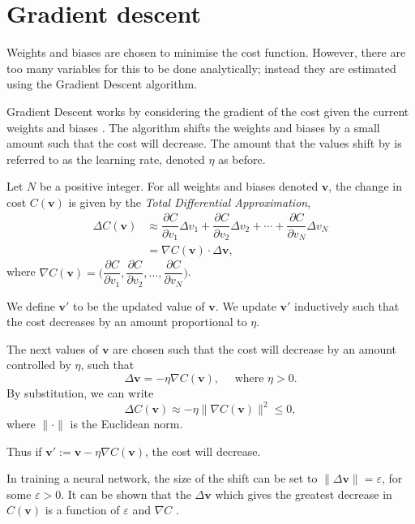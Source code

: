 \section{Gradient descent}\label{nnets-graddesc}

Weights and biases are chosen to minimise the cost function. However, there are too many variables for this to be done analytically; instead they are estimated using the Gradient Descent algorithm.

Gradient Descent works by considering the gradient of the cost given the current weights and biases \cite{Nielson2015}. The algorithm shifts the weights and biases by a small amount such that the cost will decrease. The amount that the values shift by is referred to as the learning rate, denoted $\eta$ as before.

Let $N$ be a positive integer. For all weights and biases denoted $\mathbf{v}$, the change in cost $C(\mathbf{v})$ is given by the \textit{Total Differential Approximation},
\begin{align*}
	\Delta C(\mathbf{v}) & \approx \dfrac{\partial C}{\partial v_1}\Delta v_1 + \dfrac{\partial C}{\partial v_2}\Delta v_2 + \cdots + \dfrac{\partial C}{\partial v_N}\Delta v_N\\
	& = \nabla C(\mathbf{v})\cdot \Delta \mathbf{v},
\end{align*}
where $\nabla C(\mathbf{v}) = \Big(\dfrac{\partial C}{\partial v_1}, \dfrac{\partial C}{\partial v_2},\ldots, \dfrac{\partial C}{\partial v_N}\Big)$.

We define $\mathbf{v}'$ to be the updated value of $\mathbf{v}$. We update $\mathbf{v}'$ inductively such that the cost decreases by an amount proportional to $\eta$.

The next values of $\mathbf{v}$ are chosen such that the cost will decrease by an amount controlled by $\eta$, such that
\[
	\Delta\mathbf{v} = -\eta \nabla C(\mathbf{v}), \quad \text{ where }\eta > 0.
\]
By substitution, we can write
\[
	\Delta C(\mathbf{v}) \approx -\eta \|\nabla C(\mathbf{v})\|^2 \le 0,
\]
where $\|\cdot\|$ is the Euclidean norm.

Thus if $\mathbf{v}' := \mathbf{v} - \eta \nabla C(\mathbf{v})$, the cost will decrease.

In training a neural network, the size of the shift can be set to $\|\Delta\mathbf{v}\| = \varepsilon$, for some $\varepsilon > 0$. It can be shown that the $\Delta\mathbf{v}$ which gives the greatest decrease in $C(\mathbf{v})$ is a function of $\varepsilon$ and $\nabla C$ \cite{Nielson2015}.

